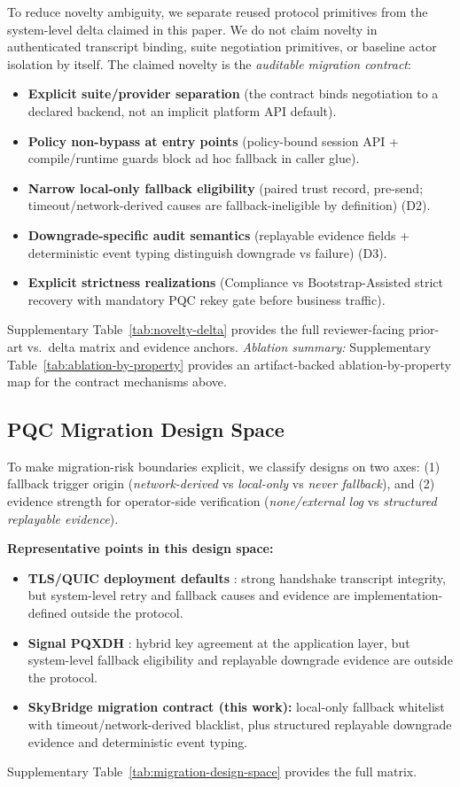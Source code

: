 \documentclass[10pt,journal,compsoc]{IEEEtran}
\providecommand{\tightlist}{%
  \setlength{\itemsep}{0pt}\setlength{\parskip}{0pt}}
\begin{document}
To reduce novelty ambiguity, we separate reused protocol primitives from
the system-level delta claimed in this paper. We do not claim novelty in
authenticated transcript binding, suite negotiation primitives, or
baseline actor isolation by itself. The claimed novelty is the
\emph{auditable migration contract}:
\begin{itemize}\tightlist
\item \textbf{Explicit suite/provider separation} (the contract binds negotiation to a declared backend, not an implicit platform API default).
\item \textbf{Policy non-bypass at entry points} (policy-bound session API + compile/runtime guards block ad hoc fallback in caller glue).
\item \textbf{Narrow local-only fallback eligibility} (paired trust record, pre-send; timeout/network-derived causes are fallback-ineligible by definition) (D2).
\item \textbf{Downgrade-specific audit semantics} (replayable evidence fields + deterministic event typing distinguish downgrade vs failure) (D3).
\item \textbf{Explicit strictness realizations} (Compliance vs Bootstrap-Assisted strict recovery with mandatory PQC rekey gate before business traffic).
\end{itemize}
Supplementary Table~\ref{tab:novelty-delta} provides the full reviewer-facing prior-art vs.\ delta matrix and evidence anchors.
\textit{Ablation summary:} Supplementary Table~\ref{tab:ablation-by-property} provides an artifact-backed ablation-by-property map for the contract mechanisms above.

\subsection{PQC Migration Design
Space}\label{sec:migration-design-space}

To make migration-risk boundaries explicit, we classify designs on two
axes: (1) fallback trigger origin (\emph{network-derived} vs
\emph{local-only} vs \emph{never fallback}), and (2) evidence strength
for operator-side verification (\emph{none/external log} vs
\emph{structured replayable evidence}).

\textbf{Representative points in this design space:}
\begin{itemize}\tightlist
\item \textbf{TLS/QUIC deployment defaults} \cite{ref6,ref18}: strong handshake transcript integrity, but system-level retry and fallback causes and evidence are implementation-defined outside the protocol.
\item \textbf{Signal PQXDH} \cite{ref9}: hybrid key agreement at the application layer, but system-level fallback eligibility and replayable downgrade evidence are outside the protocol.
\item \textbf{SkyBridge migration contract (this work):} local-only fallback whitelist with timeout/network-derived blacklist, plus structured replayable downgrade evidence and deterministic event typing.
\end{itemize}
Supplementary Table~\ref{tab:migration-design-space} provides the full matrix.
\end{document}
